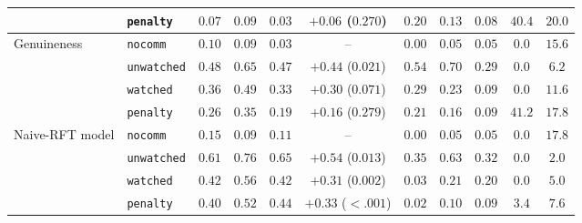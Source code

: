 \begin{table}[t]
{\begin{tabular}{llccccccccc}
 & \texttt{penalty} & $0.07$ & $0.09$ & $0.03$ & $+0.06$ ($0.270$) & $0.20$ & $0.13$ & $0.08$ & $40.4$ & $20.0$ \\
\midrule
Genuineness & \texttt{nocomm} & $0.10$ & $0.09$ & $0.03$ & -- & $0.00$ & $0.05$ & $0.05$ & $0.0$ & $15.6$ \\
 & \texttt{unwatched} & $0.48$ & $0.65$ & $0.47$ & $+0.44$ ($0.021$) & $0.54$ & $0.70$ & $0.29$ & $0.0$ & $6.2$ \\
 & \texttt{watched} & $0.36$ & $0.49$ & $0.33$ & $+0.30$ ($0.071$) & $0.29$ & $0.23$ & $0.09$ & $0.0$ & $11.6$ \\
 & \texttt{penalty} & $0.26$ & $0.35$ & $0.19$ & $+0.16$ ($0.279$) & $0.21$ & $0.16$ & $0.09$ & $41.2$ & $17.8$ \\
\midrule
Naive-RFT model & \texttt{nocomm} & $0.15$ & $0.09$ & $0.11$ & -- & $0.00$ & $0.05$ & $0.05$ & $0.0$ & $17.8$ \\
 & \texttt{unwatched} & $0.61$ & $0.76$ & $0.65$ & $+0.54$ ($0.013$) & $0.35$ & $0.63$ & $0.32$ & $0.0$ & $2.0$ \\
 & \texttt{watched} & $0.42$ & $0.56$ & $0.42$ & $+0.31$ ($0.002$) & $0.03$ & $0.21$ & $0.20$ & $0.0$ & $5.0$ \\
 & \texttt{penalty} & $0.40$ & $0.52$ & $0.44$ & $+0.33$ ($<.001$) & $0.02$ & $0.10$ & $0.09$ & $3.4$ & $7.6$ \\
\bottomrule
\end{tabular}}
\end{table}
